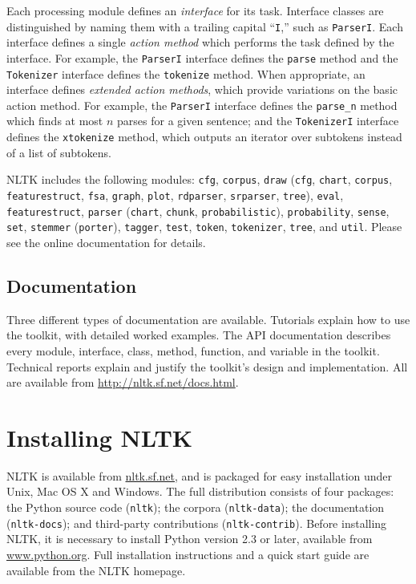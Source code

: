 \documentclass[11pt]{article}
\def\object#1{\texttt{\small #1}}
\begin{document}
Each processing module defines an \emph{interface} for its task.
Interface classes are distinguished by naming them with a trailing
capital ``\object{I},'' such as \object{ParserI}.
Each interface defines a single \emph{action method} which
performs the task defined by the interface.  For example, the
\object{ParserI} interface defines the \object{parse} method and the
\object{Tokenizer} interface defines the \object{tokenize} method.
When appropriate, an interface defines \emph{extended action
  methods}, which provide variations on the basic action method.  For
example, the \object{ParserI} interface defines the \object{parse\_n}
method which finds at most $n$ parses for a given sentence; and
the \object{TokenizerI} interface defines the \object{xtokenize}
method, which outputs an iterator over subtokens instead of a list of
subtokens.

NLTK includes the following modules:
\object{cfg},
\object{corpus},
\object{draw}
(\object{cfg},
\object{chart},
\object{corpus},
\object{featurestruct},
\object{fsa},
\object{graph},
\object{plot},
\object{rdparser},
\object{srparser},
\object{tree}),
\object{eval},
\object{featurestruct},
\object{parser}
(\object{chart},
\object{chunk},
\object{probabilistic}),
\object{probability},
\object{sense},
\object{set},
\object{stemmer}
(\object{porter}),
\object{tagger},
\object{test},
\object{token},
\object{tokenizer},
\object{tree}, and
\object{util}.
Please see the online documentation for details.

\subsection{Documentation}

Three different types of documentation are available.  Tutorials
explain how to use the toolkit, with detailed worked examples.  The
API documentation describes every module, interface, class, method,
function, and variable in the toolkit.  Technical reports explain and
justify the toolkit's design and implementation.  All are available
from \url{http://nltk.sf.net/docs.html}.

\section{Installing NLTK}

NLTK is available from \url{nltk.sf.net}, and is packaged for
easy installation under Unix, Mac OS X and Windows.  The full
distribution consists of four packages: the Python source code
(\object{nltk}); the corpora (\object{nltk-data}); the documentation
(\object{nltk-docs}); and third-party contributions
(\object{nltk-contrib}).  Before installing NLTK, it is necessary to
install Python version 2.3 or later, available from
\url{www.python.org}.  Full installation instructions and a quick
start guide are available from the NLTK homepage.
\end{document}
